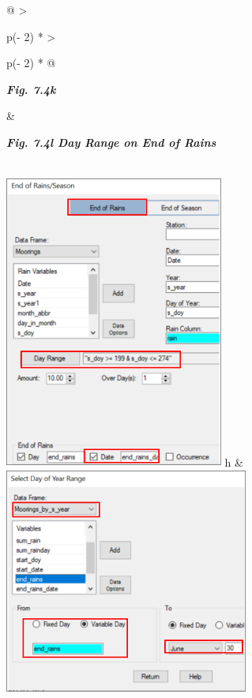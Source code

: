 \documentclass[
  letterpaper,
  DIV=11,
  numbers=noendperiod]{scrreprt}
\begin{document}
\begin{longtable}[]{@{}
  >{\raggedright\arraybackslash}p{(\columnwidth - 2\tabcolsep) * }
  >{\raggedright\arraybackslash}p{(\columnwidth - 2\tabcolsep) * }@{}}
\toprule\noalign{}
\begin{minipage}[b]{\linewidth}\raggedright
\textbf{\emph{Fig. 7.4k}}
\end{minipage} & \begin{minipage}[b]{\linewidth}\raggedright
\textbf{\emph{Fig. 7.4l Day Range on End of Rains}}
\end{minipage} \\
\midrule\noalign{}
\endhead
\bottomrule\noalign{}
\endlastfoot
\includegraphics[width=2.83286in,height=3.82203in]{figures/Fig7.4k.png}
h &
\includegraphics[width=3.16008in,height=\textheight]{figures/Fig7.4l.png} \\
\end{longtable}
\end{document}
